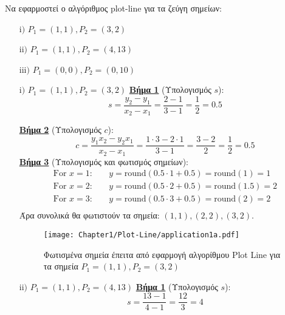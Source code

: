 \begin{application}
		Να εφαρμοστεί ο αλγόριθμος plot-line για τα ζεύγη σημείων:
\begin{enumerate}
	\item[$\mathrm{i)}$] $P_1 = (1, 1), P_2 = (3, 2)$
	\item[$\mathrm{ii)}$] $P_1 = (1, 1), P_2 = (4, 13)$
	\item[$\mathrm{iii)}$] $P_1 = (0, 0), P_2 = (0, 10)$	
\end{enumerate}

\begin{solution}
		

\begin{enumerate}
	\item[$\mathrm{i)}$] $P_1 = (1, 1), P_2 = (3, 2)$ \newline 
		\textbf{\underline{Βήμα 1}} (Υπολογισμός $s$):	
		\[
		s = \frac{y_2 - y_1}{x_2 - x_1} = \frac{2 - 1}{3 - 1} = \frac{1}{2} = 0.5
		\] 	
		
		\textbf{\underline{Βήμα 2}} (Υπολογισμός $c$):	
		\[
		c = \frac{y_1 x_2 - y_2 x_1}{x_2 - x_1} = \frac{1 \cdot 3 - 2 \cdot 1}{3 - 1} = \frac{3 - 2}{2} = \frac{1}{2} = 0.5	
		\]
		\textbf{\underline{Βήμα 3}} (Υπολογισμός και φωτισμός σημείων):		
		\begin{align*}
		   \text{For } x = 1: & \quad y = \text{round}(0.5 \cdot 1 + 0.5) = \text{round}(1) = 1 \\
		   \text{For } x = 2: & \quad y = \text{round}(0.5 \cdot 2 + 0.5) = \text{round}(1.5) = 2 \\
		   \text{For } x = 3: & \quad y = \text{round}(0.5 \cdot 3 + 0.5) = \text{round}(2) = 2 \\
		\end{align*}
		Άρα συνολικά θα φωτιστούν τα σημεία: \( (1, 1), (2, 2), (3, 2) \).
		
		\begin{figure}[hbt]
		  \begin{center}
			\texttt{[image: Chapter1/Plot-Line/application1a.pdf]}
		  \end{center}
		  \caption{Φωτισμένα σημεία έπειτα από εφαρμογή αλγορίθμου Plot Line για τα σημεία $P_1 = (1,1), P_2 = (3,2)$}
		\end{figure}


	\item[$\mathrm{ii)}$] $P_1 = (1, 1), P_2 = (4, 13)$ \newline 
		\textbf{\underline{Βήμα 1}} (Υπολογισμός $s$):
		\[
		   s = \frac{13 - 1}{4 - 1} = \frac{12}{3} = 4
		\]
		

\end{enumerate}
\end{solution}
\end{application}
